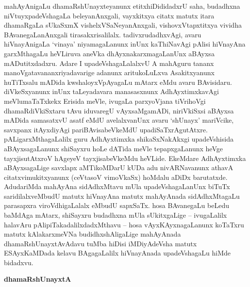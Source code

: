 mahAyAnigaLu dhamaRshUnayxteyanunx etitxhiDididadxrU saha, budadhxna niVtuyxpa\-deVshagaLa beleyanAnxgali, vayxkitxya citatx matutx itara dhamaRgaLa sUkaSxmX vishelxVSaNe\-yanAnxgali, vishovxVtapxtitxya vividha BAvanegaLanAnxgali tirasakxrisalilalx. tadivxrudadhxvAgi, avaru hiVnayAnigaLa `vinaya' niyamagaLanunx inUnx kaThiNavAgi pAlisi hiVnayAna garxMthagaLu heVLiruva aneVka dhAyxnakarxmagaLanUnx aBAyxsa mADutitxdadxru. Adare I upadeVshagaLalalxvU A mahAguru tananx manoVgatavananxriyadavarige adanunx aritukoLuLxva Asakitxyanunx huTiTxsalu mADida kwshaloyxVpAyagaLu mAtarx eMdu avaru BAvisidaru. diVkeSxyanunx inUnx taLeyadavara manasasxnunx AdhAyxtimxkavAgi meVlumaTaTxkekx Erisida meVle, ivugaLa parxyoVjana tiVrihoVgi dhamaRdiVkiSxtaru tAvu iduvaregU vAyxsaMgamADi, niriVkiSxsi aBAyxsa mADida samasatxvU asatf eMdU avelalxvanUnx avaru `shUnayx' mariVcike, savxpanx itAyxdiyAgi pariBAvisabeVkeMdU upadiSaTxrAgutAtxre. pALigarxMthagaLalilx guru AdhAyxtimxka shikaSxNakAkxgi upadeVshisida aBAyxsagaLanunx shiSayxru hoLe dATida meVle tepapxgaLanunx heVge tayxjisutAtxroV hAgeyeV tayxjisabeVkeMdu heVLide. EkeMdare AdhAyxtimxka aBAyxsagaLige savxlapx aMTikoMDarU kUDa adu nivARNavanunx athavA citatxvimukitxyanunx (ceVtasoV vimoVkaSx) hoMdalu aDiDx barutatxde. AdudariMda mahAyAna sidAdhxMtavu mUla upadeVshagaLanUnx biTuTx saridilalxveMbudU matutx hiVnayAna matutx mahAyAnada sidAdhxMtagaLu parasapxra viroVdhigaLalalx eMbudU sapxSaTx. hosa BAvanegaLu beLedu baMdAga mAtarx, shiSayxru budadhxna mUla sUkitxgaLige -- ivugaLalilx halavAru pAlipiTakadalilxdadxMthavu -- hosa vAyxKAyxnagaLanunx koTaTxru matutx kAlakarxmeVNa budidhxshAligaLige mahAyAnada dhamaRshUnayxtAvAdavu tuMba hiDisi iMDiyAdeVsha matutx ESAyxKaMDada kelavu BAgagaLalilx hiVnayAnada upadeVshagaLu hiMde bidadxvu.

\begin{center}
{\textbf{\Large dhamaRshUnayxtA}}
\end{center}

